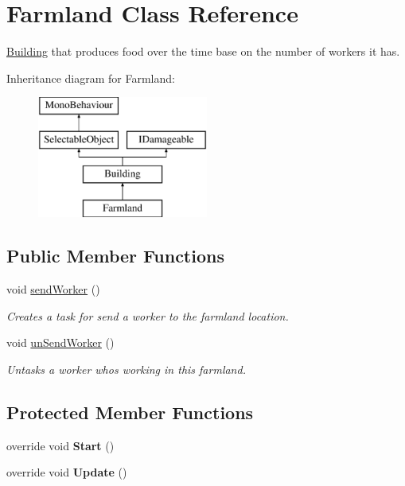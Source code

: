 \hypertarget{class_farmland}{}\section{Farmland Class Reference}
\label{class_farmland}


\mbox{\hyperlink{class_building}{Building}} that produces food over the time base on the number of workers it has.  


Inheritance diagram for Farmland\+:\begin{figure}[H]
\begin{center}
\leavevmode
\includegraphics[height=4.000000cm]{class_farmland}
\end{center}
\end{figure}
\subsection*{Public Member Functions}
\begin{DoxyCompactItemize}
\item 
void \mbox{\hyperlink{class_farmland_a80ea2b37e60fa6d717df66597e38b48e}{send\+Worker}} ()
\begin{DoxyCompactList}\small\item\em Creates a task for send a worker to the farmland location. \end{DoxyCompactList}\item 
void \mbox{\hyperlink{class_farmland_a30433b1416b8d632c99b60e302342530}{un\+Send\+Worker}} ()
\begin{DoxyCompactList}\small\item\em Untasks a worker whos working in this farmland. \end{DoxyCompactList}\end{DoxyCompactItemize}
\subsection*{Protected Member Functions}
\begin{DoxyCompactItemize}
\item 
\mbox{\label{class_farmland_a08ec0a983910e984e5cd880704981803}} 
override void {\bfseries Start} ()
\item 
\mbox{\label{class_farmland_abd481224dd71e7a2ff01b9fcb747618a}} 
override void {\bfseries Update} ()
\end{DoxyCompactItemize}
